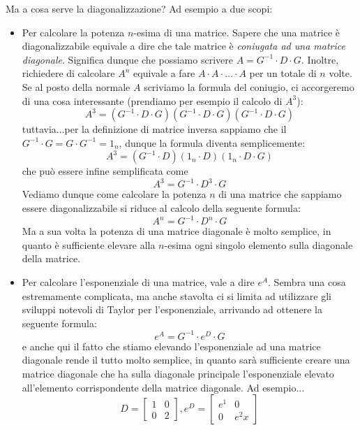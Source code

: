 \documentclass[12pt]{report}
\begin{document}
	Ma a cosa serve la diagonalizzazione?
	Ad esempio a due scopi:
	\begin{itemize}
		\item Per calcolare la potenza $n$-esima di una matrice. Sapere che una matrice è diagonalizzabile equivale a dire che tale matrice è \textit{coniugata ad una matrice diagonale}. Significa dunque che possiamo scrivere $A = G^{-1} \cdot D \cdot G$.
		Inoltre, richiedere di calcolare $A^n$ equivale a fare $A \cdot A \cdot \dots \cdot A$ per un totale di $n$ volte.
		Se al posto della normale $A$ scriviamo la formula del coniugio, ci accorgeremo di una cosa interessante (prendiamo per esempio il calcolo di $A^3$):
		\[
			A^3 = (G^{-1} \cdot D \cdot G)(G^{-1} \cdot D \cdot G)(G^{-1} \cdot D \cdot G)
		\]
		tuttavia...per la definizione di matrice inversa sappiamo che il $G^{-1} \cdot G = G \cdot G^{-1} = 1_n$, dunque la formula diventa semplicemente:
		\[
			A^3 = (G^{-1} \cdot D)(1_n \cdot D)(1_n \cdot D \cdot G)
		\]
		che può essere infine semplificata come
		\[
			A^3 = G^{-1} \cdot D^3 \cdot G
		\]
		Vediamo dunque come calcolare la potenza $n$ di una matrice che sappiamo essere diagonalizzabile si riduce al calcolo della seguente formula:
		\[
			A^n = G^{-1} \cdot D^n \cdot G
		\]
		Ma a sua volta la potenza di una matrice diagonale è molto semplice, in quanto è sufficiente elevare alla $n$-esima ogni singolo elemento sulla diagonale della matrice.
		
		\item Per calcolare l'esponenziale di una matrice, vale a dire $e^A$. Sembra una cosa estremamente complicata, ma anche stavolta ci si limita ad utilizzare gli sviluppi notevoli di Taylor per l'esponenziale, arrivando ad ottenere la seguente formula:
		\[
			e^A = G^{-1} \cdot e^D \cdot G
		\]
		e anche qui il fatto che stiamo elevando l'esponenziale ad una matrice diagonale rende il tutto molto semplice, in quanto sarà sufficiente creare una matrice diagonale che ha sulla diagonale principale l'esponenziale elevato all'elemento corrispondente della matrice diagonale. Ad esempio...
		\[
			D = 
			\begin{bmatrix}
				1 & 0\\
				0 & 2
			\end{bmatrix}, 
			e^D = 
			\begin{bmatrix}
				e^1 & 0\\
				0 & e^2x
			\end{bmatrix}
		\]
		
	\end{itemize}
	
\end{document}

